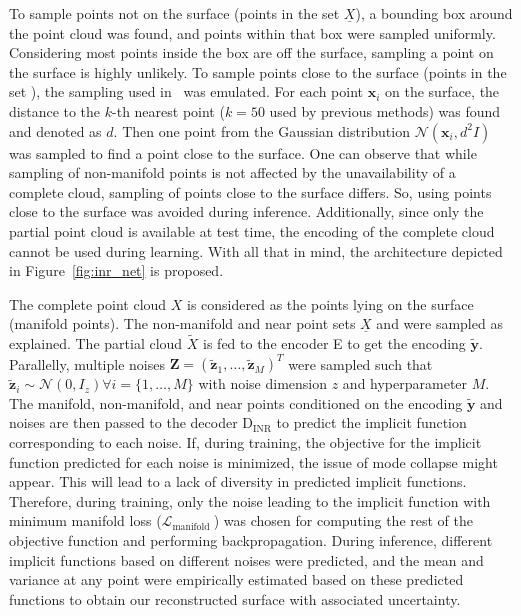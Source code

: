     To sample points not on the surface (points in the set $\underline{X}$), a bounding box around the point cloud was found, and points within that box were sampled uniformly. Considering most points inside the box are off the surface, sampling a point on the surface is highly unlikely. To sample points close to the surface (points in the set ), the sampling used in~\cite{IGR, SALD, NeuralHessian} was emulated. For each point $\mathbf{x}_i$ on the surface, the distance to the $k$-th nearest point ($k=50$ used by previous methods) was found and denoted as $d$. Then one point from the Gaussian distribution $\mathcal{N}(\mathbf{x}_i, d^2I)$ was sampled to find a point close to the surface. One can observe that while sampling of non-manifold points is not affected by the unavailability of a complete cloud, sampling of points close to the surface differs. So, using points close to the surface was avoided during inference. Additionally, since only the partial point cloud is available at test time, the encoding of the complete cloud cannot be used during learning. With all that in mind, the architecture depicted in Figure~\ref{fig:inr_net} is proposed.
    \newline
    
    The complete point cloud $X$ is considered as the points lying on the surface (manifold points). The non-manifold and near point sets $\underline{X}$ and  were sampled as explained. The partial cloud $\tilde{X}$ is fed to the encoder E to get the encoding $\mathbf{\tilde{y}}$. Parallelly, multiple noises $\mathbf{Z} = (\mathbf{\tilde{z}}_1, \ldots, \mathbf{\tilde{z}}_M)^T$ were sampled such that $\mathbf{\tilde{z}}_i \sim \mathcal{N}(0, I_z) \forall i=\{1, \ldots, M\}$ with noise dimension $z$ and hyperparameter $M$. The manifold, non-manifold, and near points conditioned on the encoding $\mathbf{\tilde{y}}$ and noises are then passed to the decoder D$_{\text{INR}}$ to predict the implicit function corresponding to each noise. If, during training, the objective for the implicit function predicted for each noise is minimized, the issue of mode collapse might appear. This will lead to a lack of diversity in predicted implicit functions. Therefore, during training, only the noise leading to the implicit function with minimum manifold loss ($\mathcal{L}_{\text {manifold }}$) was chosen for computing the rest of the objective function and performing backpropagation. During inference, different implicit functions based on different noises were predicted, and the mean and variance at any point were empirically estimated based on these predicted functions to obtain our reconstructed surface with associated uncertainty.
    \newline
    
